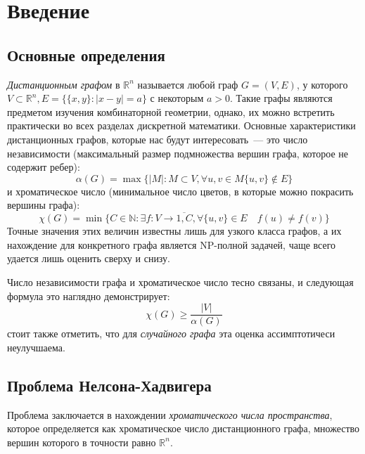 \section{Введение}
\subsection{Основные определения}

\emph{Дистанционным графом} в $\mathbb R^n$ называется любой граф $G=(V,E)$,
у которого $V \subset \mathbb R^n, E=\{\{x,y\}: |x-y|=a\}$ с некоторым $a > 0$.
Такие графы являются предметом изучения комбинаторной геометрии, однако,
их можно встретить практически во всех разделах дискретной математики.
Основные характеристики дистанционных графов, которые нас будут
интересовать~--- это число независимости (максимальный размер подмножества
вершин графа, которое не содержит ребер):
\begin{displaymath}
    \alpha(G) = \max\{ |M|: M \subset V, \forall u,v \in M \{u,v\} \notin E \}
\end{displaymath}
и хроматическое число (минимальное число цветов, в которые можно покрасить
вершины графа):
\begin{displaymath}
    \chi(G) = \min\{C \in \mathbb N: \exists f: V \to \overline{1, C},
        \forall \{u,v\} \in E \quad f(u) \neq f(v)
    \}
\end{displaymath}
Точные значения этих величин известны лишь для узкого класса графов,
а их нахождение для конкретного графа является NP-полной задачей, чаще
всего удается лишь оценить сверху и снизу.

Число независимости графа и хроматическое число тесно связаны,
и следующая формула это наглядно демонстрирует:
\begin{equation}
    \chi(G) \geq \frac{|V|}{\alpha(G)}
\end{equation}
стоит также отметить, что для
\emph{случайного графа} эта оценка ассимптотичеси неулучшаема. 

\subsection{Проблема Нелсона-Хадвигера}

Проблема заключается в нахождении \emph{хроматического числа пространства},
которое определяется как хроматическое число дистанционного графа, множество
вершин которого в точности равно $\mathbb R^n$.
